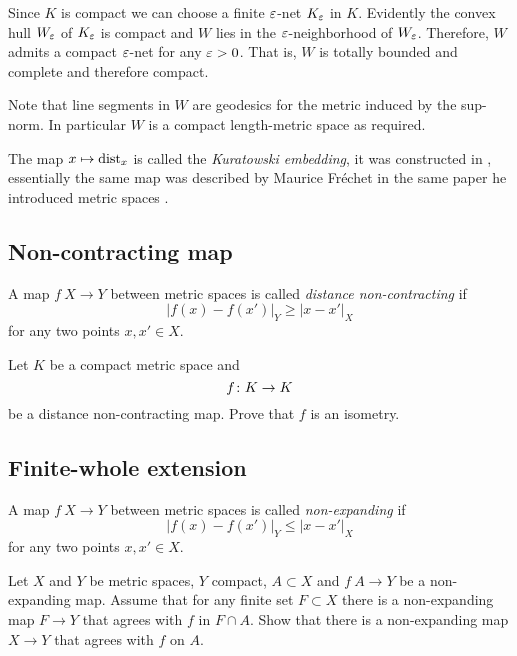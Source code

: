 Since $K$ is compact we can choose a finite $\varepsilon$-net $K_\varepsilon$ in $K$.
Evidently the convex hull $W_\varepsilon$ of $K_\varepsilon$ is compact and $W$ lies in the $\varepsilon$-neighborhood of $W_\varepsilon$.
Therefore, $W$ admits a compact $\varepsilon$-net for any $\varepsilon>0$.
That is, $W$ is totally bounded and complete and therefore compact.

Note that line segments in $W$ are geodesics for the metric induced by the sup-norm. 
In particular $W$ is a compact length-metric space as required.
\qeds

The map $x\mapsto \operatorname{\rm dist}\nolimits_x$ is called the \emph{Kuratowski embedding},
it was constructed in \cite{kuratowski},
essentially the same map 
was described by Maurice Fr\'echet 
in the same paper he introduced metric spaces \cite[see][]{frechet}.


\subsection*{Non-contracting map\easy}
\label{Noncontracting map}

A map $f\: X\to Y$ between metric spaces is called \emph{distance non-contracting} if
\[|f(x)-f(x')|_Y\ge |x-x'|_X\]
for any two points $x,x'\in X$.

\begin{pr}
Let $K$  be a compact metric space and
\[f\:K\z\to K\] 
be a distance non-contracting map.
Prove that $f$ is an isometry.
\end{pr}

\subsection*{Finite-whole extension}
\label{Finite-whole extension}

A map $f\: X\to Y$ between metric spaces is called \emph{non-expanding} if
\[|f(x)-f(x')|_Y\le |x-x'|_X\]
for any two points $x,x'\in X$.

\begin{pr}
Let $X$ and $Y$ be metric spaces, 
$Y$ compact,
$A\subset X$ and $f\:A\to Y$ be a non-expanding map.
Assume that for any finite set $F\subset X$ there is a non-expanding map $F \to Y$
that agrees with $f$ in $F\cap A$.
Show that there is a non-expanding map $X\to  Y$ that agrees with $f$ on $A$.
\end{pr}


